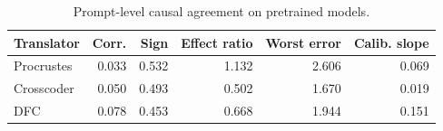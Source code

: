 \begin{table}[t]
\centering
\small
\begin{tabular}{lrrrrr}
\toprule
Translator & Corr. & Sign & Effect ratio & Worst error & Calib. slope \\
\midrule
Procrustes & 0.033 & 0.532 & 1.132 & 2.606 & 0.069 \\
Crosscoder & 0.050 & 0.493 & 0.502 & 1.670 & 0.019 \\
DFC & 0.078 & 0.453 & 0.668 & 1.944 & 0.151 \\
\bottomrule
\end{tabular}
\caption{Prompt-level causal agreement on pretrained models.}
\label{tab:table_5_4_natural_tiny}
\end{table}